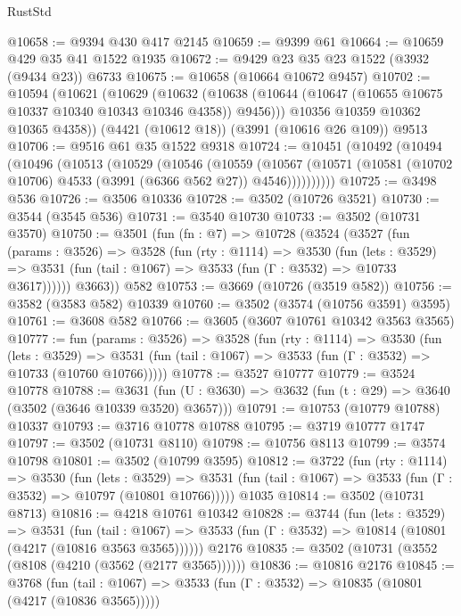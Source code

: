 \begin{lexlean}{RustStd}
\begin{coremodule}
@10658 := @9394 @430 @417 @2145
@10659 := @9399 @61
@10664 := @10659 @429 @35 @41 @1522 @1935
@10672 := @9429 @23 @35 @23 @1522 (@3932 (@9434 @23)) @6733
@10675 := @10658 (@10664 @10672 @9457)
@10702 := @10594
    (@10621
      (@10629
        (@10632 (@10638 (@10644 (@10647 (@10655 @10675 @10337 @10340 @10343 @10346 @4358)) @9456)))
        @10356
        @10359
        @10362
        @10365
        @4358))
    (@4421 (@10612 @18))
    (@3991 (@10616 @26 @109))
    @9513
@10706 := @9516 @61 @35 @1522 @9318
@10724 := @10451
    (@10492
      (@10494
        (@10496
          (@10513
            (@10529
              (@10546
                (@10559
                  (@10567
                    (@10571 (@10581 (@10702 @10706) @4533 (@3991 (@6366 @562 @27)) @4546))))))))))
@10725 := @3498 @536
@10726 := @3506 @10336
@10728 := @3502 (@10726 @3521)
@10730 := @3544 (@3545 @536)
@10731 := @3540 @10730
@10733 := @3502 (@10731 @3570)
@10750 := @3501
    (fun (fn : @7) =>
    @10728
      (@3524
        (@3527
          (fun (params : @3526) =>
          @3528
            (fun (rty : @1114) =>
            @3530
              (fun (lets : @3529) =>
              @3531 (fun (tail : @1067) => @3533 (fun (Γ : @3532) => @10733 @3617))))))
        @3663))
    @582
@10753 := @3669 (@10726 (@3519 @582))
@10756 := @3582 (@3583 @582) @10339
@10760 := @3502 (@3574 (@10756 @3591) @3595)
@10761 := @3608 @582
@10766 := @3605 (@3607 @10761 @10342 @3563 @3565)
@10777 := fun (params : @3526) =>
  @3528
    (fun (rty : @1114) =>
    @3530
      (fun (lets : @3529) =>
      @3531 (fun (tail : @1067) => @3533 (fun (Γ : @3532) => @10733 (@10760 @10766)))))
@10778 := @3527 @10777
@10779 := @3524 @10778
@10788 := @3631
    (fun (U : @3630) => @3632 (fun (t : @29) => @3640 (@3502 (@3646 @10339 @3520) @3657)))
@10791 := @10753 (@10779 @10788) @10337
@10793 := @3716 @10778 @10788
@10795 := @3719 @10777 @1747
@10797 := @3502 (@10731 @8110)
@10798 := @10756 @8113
@10799 := @3574 @10798
@10801 := @3502 (@10799 @3595)
@10812 := @3722
    (fun (rty : @1114) =>
    @3530
      (fun (lets : @3529) =>
      @3531 (fun (tail : @1067) => @3533 (fun (Γ : @3532) => @10797 (@10801 @10766)))))
    @1035
@10814 := @3502 (@10731 @8713)
@10816 := @4218 @10761 @10342
@10828 := @3744
    (fun (lets : @3529) =>
    @3531
      (fun (tail : @1067) =>
      @3533 (fun (Γ : @3532) => @10814 (@10801 (@4217 (@10816 @3563 @3565))))))
    @2176
@10835 := @3502 (@10731 (@3552 (@8108 (@4210 (@3562 (@2177 @3565))))))
@10836 := @10816 @2176
@10845 := @3768
    (fun (tail : @1067) => @3533 (fun (Γ : @3532) => @10835 (@10801 (@4217 (@10836 @3565)))))

\end{coremodule}
\end{lexlean}
